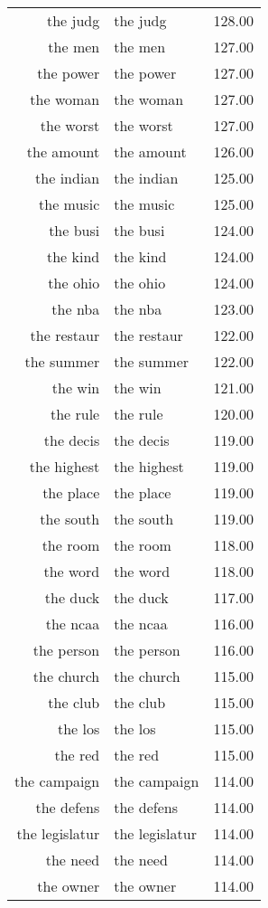 \begin{table}[ht]
\begin{tabular}{rlr}
  the judg & the judg & 128.00 \\ 
  the men & the men & 127.00 \\ 
  the power & the power & 127.00 \\ 
  the woman & the woman & 127.00 \\ 
  the worst & the worst & 127.00 \\ 
  the amount & the amount & 126.00 \\ 
  the indian & the indian & 125.00 \\ 
  the music & the music & 125.00 \\ 
  the busi & the busi & 124.00 \\ 
  the kind & the kind & 124.00 \\ 
  the ohio & the ohio & 124.00 \\ 
  the nba & the nba & 123.00 \\ 
  the restaur & the restaur & 122.00 \\ 
  the summer & the summer & 122.00 \\ 
  the win & the win & 121.00 \\ 
  the rule & the rule & 120.00 \\ 
  the decis & the decis & 119.00 \\ 
  the highest & the highest & 119.00 \\ 
  the place & the place & 119.00 \\ 
  the south & the south & 119.00 \\ 
  the room & the room & 118.00 \\ 
  the word & the word & 118.00 \\ 
  the duck & the duck & 117.00 \\ 
  the ncaa & the ncaa & 116.00 \\ 
  the person & the person & 116.00 \\ 
  the church & the church & 115.00 \\ 
  the club & the club & 115.00 \\ 
  the los & the los & 115.00 \\ 
  the red & the red & 115.00 \\ 
  the campaign & the campaign & 114.00 \\ 
  the defens & the defens & 114.00 \\ 
  the legislatur & the legislatur & 114.00 \\ 
  the need & the need & 114.00 \\ 
  the owner & the owner & 114.00 \\ 

\end{tabular}
\end{table}
